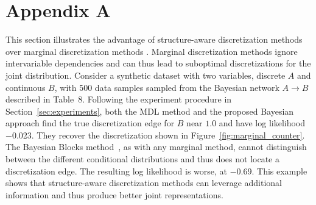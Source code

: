 



\section*{Appendix A}
\label{sec:appendixA}


This section illustrates the advantage of structure-aware discretization methods over marginal discretization methods \citep{scott1979optimal, freedman1981histogram, knuth2013optimal, scargle2013studies}.
Marginal discretization methods ignore intervariable dependencies and can thus lead to suboptimal discretizations for the joint distribution.
Consider a synthetic dataset with two variables, discrete $A$ and continuous $B$, with \num{500} data samples sampled from the Bayesian network $A \rightarrow B$ described in Table~8.  %
Following the experiment procedure in Section~\ref{sec:experiments}, both the MDL method and the proposed Bayesian approach find the true discretization edge for $B$ near $1.0$ and have log likelihood \num{-0.023}.
They recover the discretization shown in Figure~\ref{fig:marginal_counter}.
The Bayesian Blocks method~\citep{scargle2013studies}, as with any marginal method, cannot distinguish between the different conditional distributions and thus does not locate a discretization edge.
The resulting log likelihood is worse, at \num{-0.69}.
This example shows that structure-aware discretization methods can leverage additional information and thus produce better joint representations.

